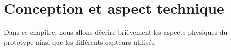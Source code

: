 \documentclass[12pt]{report}
\begin{document}

\chapter{Conception et aspect technique}
Dans ce chapitre, nous allons décrire brièvement les aspects physiques du prototype ainsi que les différents capteurs utilisés.
\end{document}
